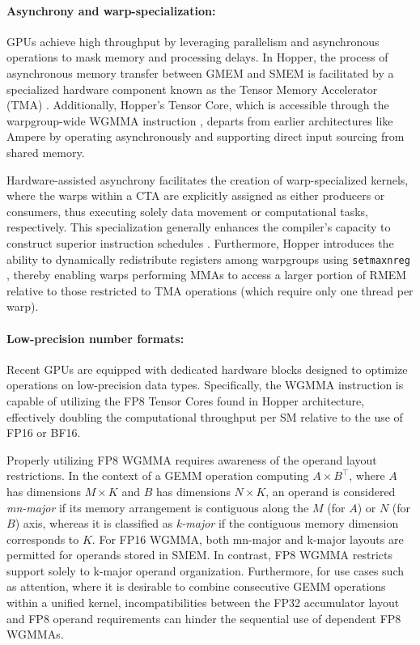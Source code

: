 \begin{enumerate}
\paragraph{Asynchrony and warp-specialization:}

GPUs achieve high throughput by leveraging parallelism and asynchronous operations to mask memory and processing delays. In Hopper, the process of asynchronous memory transfer between GMEM and SMEM is facilitated by a specialized hardware component known as the Tensor Memory Accelerator (TMA) \cite[\S7.29]{cuda}. Additionally, Hopper’s Tensor Core, which is accessible through the warpgroup-wide WGMMA instruction \cite[\S9.7.14]{ptx}, departs from earlier architectures like Ampere by operating asynchronously and supporting direct input sourcing from shared memory.

Hardware-assisted asynchrony facilitates the creation of warp-specialized kernels, where the warps within a CTA are explicitly assigned as either producers or consumers, thus executing solely data movement or computational tasks, respectively. This specialization generally enhances the compiler’s capacity to construct superior instruction schedules \citep{warp-specialization-2011}. Furthermore, Hopper introduces the ability to dynamically redistribute registers among warpgroups using \verb|setmaxnreg| \cite[\S9.7.17.1]{ptx}, thereby enabling warps performing MMAs to access a larger portion of RMEM relative to those restricted to TMA operations (which require only one thread per warp).

\paragraph{Low-precision number formats:}
\label{sec:low-precision-gpu}
Recent GPUs are equipped with dedicated hardware blocks designed to optimize operations on low-precision data types. Specifically, the WGMMA instruction is capable of utilizing the FP8 Tensor Cores found in Hopper architecture, effectively doubling the computational throughput per SM relative to the use of FP16 or BF16.

Properly utilizing FP8 WGMMA requires awareness of the operand layout restrictions. In the context of a GEMM operation computing $A \times B^{\top}$, where $A$ has dimensions $M \times K$ and $B$ has dimensions $N \times K$, an operand is considered \emph{mn-major} if its memory arrangement is contiguous along the $M$ (for $A$) or $N$ (for $B$) axis, whereas it is classified as \emph{k-major} if the contiguous memory dimension corresponds to $K$. For FP16 WGMMA, both mn-major and k-major layouts are permitted for operands stored in SMEM. In contrast, FP8 WGMMA restricts support solely to k-major operand organization. Furthermore, for use cases such as attention, where it is desirable to combine consecutive GEMM operations within a unified kernel, incompatibilities between the FP32 accumulator layout and FP8 operand requirements can hinder the sequential use of dependent FP8 WGMMAs.


\end{enumerate}
